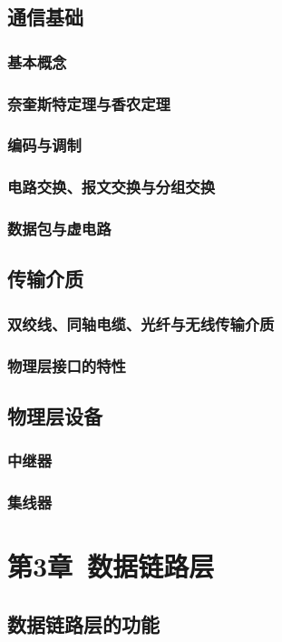 \documentclass{ctexart}
\begin{document}
\subsection{通信基础}
\subsubsection{基本概念}
\subsubsection{奈奎斯特定理与香农定理}
\subsubsection{编码与调制}
\subsubsection{电路交换、报文交换与分组交换}
\subsubsection{数据包与虚电路}
\subsection{传输介质}
\subsubsection{双绞线、同轴电缆、光纤与无线传输介质}
\subsubsection{物理层接口的特性}
\subsection{物理层设备}
\subsubsection{中继器}
\subsubsection{集线器}

\section{第3章\ 数据链路层}
\subsection{数据链路层的功能}
\end{document}
